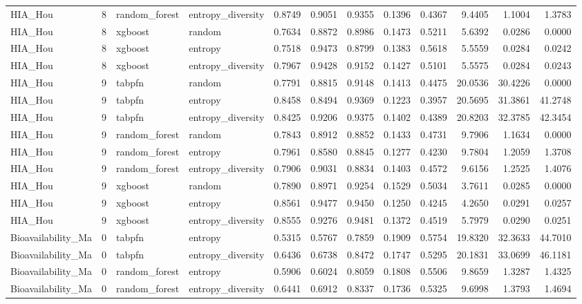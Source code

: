 \begin{tabular}{lrllrrrrrrrr}
HIA_Hou & 8 & random_forest & entropy_diversity & 0.8749 & 0.9051 & 0.9355 & 0.1396 & 0.4367 & 9.4405 & 1.1004 & 1.3783 \\
HIA_Hou & 8 & xgboost & random & 0.7634 & 0.8872 & 0.8986 & 0.1473 & 0.5211 & 5.6392 & 0.0286 & 0.0000 \\
HIA_Hou & 8 & xgboost & entropy & 0.7518 & 0.9473 & 0.8799 & 0.1383 & 0.5618 & 5.5559 & 0.0284 & 0.0242 \\
HIA_Hou & 8 & xgboost & entropy_diversity & 0.7967 & 0.9428 & 0.9152 & 0.1427 & 0.5101 & 5.5575 & 0.0284 & 0.0243 \\
HIA_Hou & 9 & tabpfn & random & 0.7791 & 0.8815 & 0.9148 & 0.1413 & 0.4475 & 20.0536 & 30.4226 & 0.0000 \\
HIA_Hou & 9 & tabpfn & entropy & 0.8458 & 0.8494 & 0.9369 & 0.1223 & 0.3957 & 20.5695 & 31.3861 & 41.2748 \\
HIA_Hou & 9 & tabpfn & entropy_diversity & 0.8425 & 0.9206 & 0.9375 & 0.1402 & 0.4389 & 20.8203 & 32.3785 & 42.3454 \\
HIA_Hou & 9 & random_forest & random & 0.7843 & 0.8912 & 0.8852 & 0.1433 & 0.4731 & 9.7906 & 1.1634 & 0.0000 \\
HIA_Hou & 9 & random_forest & entropy & 0.7961 & 0.8580 & 0.8845 & 0.1277 & 0.4230 & 9.7804 & 1.2059 & 1.3708 \\
HIA_Hou & 9 & random_forest & entropy_diversity & 0.7906 & 0.9031 & 0.8834 & 0.1403 & 0.4572 & 9.6156 & 1.2525 & 1.4076 \\
HIA_Hou & 9 & xgboost & random & 0.7890 & 0.8971 & 0.9254 & 0.1529 & 0.5034 & 3.7611 & 0.0285 & 0.0000 \\
HIA_Hou & 9 & xgboost & entropy & 0.8561 & 0.9477 & 0.9450 & 0.1250 & 0.4245 & 4.2650 & 0.0291 & 0.0257 \\
HIA_Hou & 9 & xgboost & entropy_diversity & 0.8555 & 0.9276 & 0.9481 & 0.1372 & 0.4519 & 5.7979 & 0.0290 & 0.0251 \\
Bioavailability_Ma & 0 & tabpfn & entropy & 0.5315 & 0.5767 & 0.7859 & 0.1909 & 0.5754 & 19.8320 & 32.3633 & 44.7010 \\
Bioavailability_Ma & 0 & tabpfn & entropy_diversity & 0.6436 & 0.6738 & 0.8472 & 0.1747 & 0.5295 & 20.1831 & 33.0699 & 46.1181 \\
Bioavailability_Ma & 0 & random_forest & entropy & 0.5906 & 0.6024 & 0.8059 & 0.1808 & 0.5506 & 9.8659 & 1.3287 & 1.4325 \\
Bioavailability_Ma & 0 & random_forest & entropy_diversity & 0.6441 & 0.6912 & 0.8337 & 0.1736 & 0.5325 & 9.6998 & 1.3793 & 1.4694 \\

\end{tabular}
